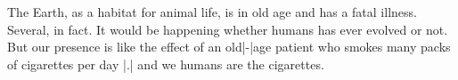 The Earth, as a habitat for animal life, is in old age and 
has a fatal illness. Several, in fact. It would be happening
whether humans has ever evolved or not. But our presence is 
like the effect of an old|-|age patient who smokes many packs
of cigarettes per day |.| and we humans are the cigarettes.   
